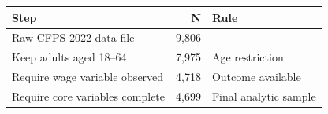 \begin{tabular}{lrl}
\toprule
Step & N & Rule \\
\midrule
Raw CFPS 2022 data file & 9,806 &  \\
Keep adults aged 18--64 & 7,975 & Age restriction \\
Require wage variable observed & 4,718 & Outcome available \\
Require core variables complete & 4,699 & Final analytic sample \\
\bottomrule
\end{tabular}
